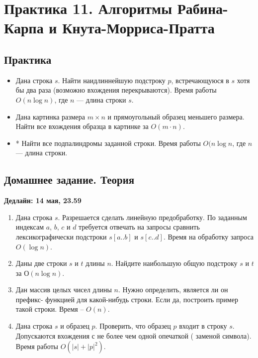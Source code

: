 \section{Практика 11. Алгоритмы Рабина-Карпа и Кнута-Морриса-Пратта}

\subsection{Практика}

\begin{itemize}

  \item Дана строка $s$. Найти наидлиннейшую подстроку $p$,
    встречающуюся в $s$ хотя бы два раза (возможно вхождения
    перекрываются). Время работы $O(n \log{n})$, где $n$ --- длина
    строки $s$.

  \item Дана картинка размера $m \times n$ и прямоугольный образец меньшего
    размера. Найти все вхождения образца в картинке за $O(m \cdot n)$.

  \item * Найти все подпалиндромы заданной строки. Время работы $O(n
    \log{n}$, где $n$ --- длина строки.
\end{itemize}

\subsection{Домашнее задание. Теория}
\textbf{Дедлайн: 14 мая, 23.59}

\begin{enumerate}

  \item Дана строка $s$. Разрешается сделать линейную предобработку.
    По заданным индексам $a$, $b$, $c$ и $d$ требуется отвечать на запросы
    сравнить лексикографически подстроки $s[a..b]$ и $s[c..d]$. Время на
    обработку запроса $O(\log n)$.
    
  \item Даны две строки $s$ и $t$ длины $n$. Найдите наибольшую общую подстроку 
    $s$ и $t$ за $О(n \log{n})$.

  \item Дан массив целых чисел длины $n$. Нужно определить, является ли он префикс-
    функцией для какой-нибудь строки. Если да, построить пример такой строки. 
    Время -- $O(n)$.

  \item Дана строка $s$ и образец $p$. Проверить, что образец $p$
    входит в строку $s$. Допускаются вхождения с не более чем одной опечаткой (
    заменой символа).  Время работы $O(|s| + |p|^2)$.

\end{enumerate}



\clearpage
